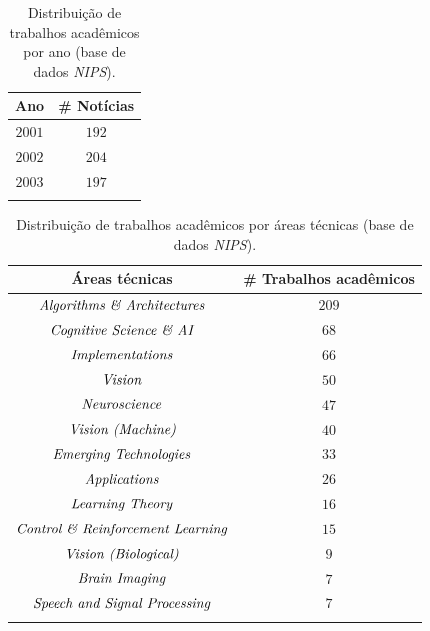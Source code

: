 \documentclass[
    12pt,                %
    oneside,            %
    a4paper,            %
    english,            %
    brazil                %
    ]{abntex2ppgsi}
\begin{document}
\begin{table}[h]
\centering
\caption{Distribuição de trabalhos acadêmicos por ano (base de dados \textit{NIPS}).}
    \begin{tabular}{cc}
        \hline
        Ano & \# Notícias \\
        \hline
        $2001$ & $192$ \\
        $2002$ & $204$ \\
        $2003$ & $197$ \\
        \hline
        & \\
    \end{tabular}
    \label{tab:nips:distano}
\end{table}

\begin{table}[h]
    \centering
    \caption{Distribuição de trabalhos acadêmicos por áreas técnicas (base de dados \textit{NIPS}).}
    \begin{tabular}{cc}
        Áreas técnicas & \# Trabalhos acadêmicos \\
        \hline
        $\text{\textit{Algorithms \& Architectures}}$       & $209$ \\
        $\text{\textit{Cognitive Science \& AI}}$           & $68$  \\
        $\text{\textit{Implementations}}$                   & $66$  \\
        $\text{\textit{Vision}}$                            & $50$  \\
        $\text{\textit{Neuroscience}}$                      & $47$  \\
        $\text{\textit{Vision (Machine)}}$                  & $40$  \\
        $\text{\textit{Emerging Technologies}}$             & $33$  \\
        $\text{\textit{Applications}}$                      & $26$  \\
        $\text{\textit{Learning Theory}}$                   & $16$  \\
        $\text{\textit{Control \& Reinforcement Learning}}$ & $15$  \\
        $\text{\textit{Vision (Biological)}}$               & $9$   \\
        $\text{\textit{Brain Imaging}}$                     & $7$   \\
        $\text{\textit{Speech and Signal Processing}}$      & $7$   \\
        \hline
        & \\
    \end{tabular}
    \label{tab:nips:distpapers}
\end{table}
\end{document}
